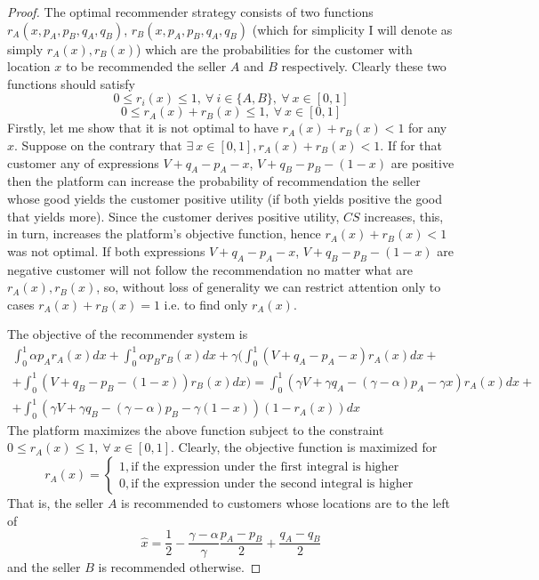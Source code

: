 \documentclass[a4paper]{article}
\begin{document}
	\begin{proof}
	 The optimal recommender strategy consists of two functions $r_A(x, p_A, p_B, q_A, q_B)$, $r_B(x, p_A, p_B, q_A, q_B)$ (which for simplicity I will denote as simply $r_A(x), r_B(x)$) which are the probabilities for the customer with location $x$ to be recommended the seller $A$ and $B$ respectively. Clearly these two functions should satisfy $$0 \le r_i(x) \le 1,\ \forall\ i \in \{A, B\},\ \forall\ x \in [0, 1] $$ $$0 \le r_A(x) + r_B(x) \le 1,\ \forall\ x \in [0, 1]$$ 
	 Firstly, let me show that it is not optimal to have $r_A(x) + r_B(x) < 1$ for any $x$. Suppose on the contrary that $\exists\ x \in [0, 1], r_A(x)+r_B(x) < 1$. If for that customer any of expressions $V+q_A-p_A-x$, $V+q_B-p_B-(1-x)$ are positive then the platform can increase the probability of recommendation the seller whose good yields the customer positive utility (if both yields positive the good that yields more). Since the customer derives positive utility, $CS$ increases, this, in turn, increases the platform's objective function, hence $r_A(x) +r_B(x) < 1$ was not optimal. If both expressions $V+q_A-p_A-x$, $V+q_B-p_B-(1-x)$ are negative customer will not follow the recommendation no matter what are $r_A(x), r_B(x)$, so, without loss of generality we can restrict attention only to cases $r_A(x) + r_B(x) = 1$ i.e. to find only $r_A(x)$. 
	 
	 
	 
	 The objective of the recommender system is \begin{align*}
	 \int_{0}^1 \alpha p_A r_A(x)dx + \int_{0}^1 \alpha p_B r_B(x)dx + \gamma \biggl( \int_{0}^1 (V+q_A-p_A-x)r_A(x)dx + \\+\int_{0}^1 (V+q_B-p_B-(1-x))r_B(x)dx \biggr) = \int_0^1 (\gamma V + \gamma q_A - (\gamma - \alpha)p_A - \gamma x) r_A(x)dx +\\+ \int_0^1 (\gamma V + \gamma q_B - (\gamma - \alpha)p_B - \gamma(1- x))(1- r_A(x))dx
	 \end{align*}
	 The platform maximizes the above function subject to the constraint $0 \le r_A(x) \le 1,\ \forall\ x \in [0, 1]$. Clearly, the objective function is maximized for $$r_A(x) = \begin{cases}
	 1, \text{if the expression under the first integral is higher}\\
	 0, \text{if the expression under the second integral is higher}
	 \end{cases}$$
	 That is, the seller $A$ is recommended to customers whose locations are to the left of $$\hat{x} = \frac{1}{2} - \frac{\gamma - \alpha}{\gamma} \frac{p_A - p_B}{2} + \frac{q_A - q_B}{2}$$
	 and the seller $B$ is recommended otherwise. 
	 

\end{proof}
\end{document}
